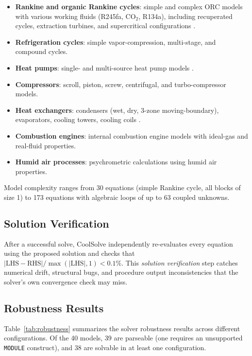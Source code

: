 \documentclass[review,3p]{elsarticle}
\begin{document}
\begin{itemize}
    \item \textbf{Rankine and organic Rankine cycles}: simple and complex ORC models with various working fluids (R245fa, CO$_2$, R134a), including recuperated cycles, extraction turbines, and supercritical configurations \cite{Quoilin2011, Quoilin2013}.
    \item \textbf{Refrigeration cycles}: simple vapor-compression, multi-stage, and compound cycles.
    \item \textbf{Heat pumps}: single- and multi-source heat pump models \cite{Lemort2009}.
    \item \textbf{Compressors}: scroll, piston, screw, centrifugal, and turbo-compressor models.
    \item \textbf{Heat exchangers}: condensers (wet, dry, 3-zone moving-boundary), evaporators, cooling towers, cooling coils \cite{Desideri2014}.
    \item \textbf{Combustion engines}: internal combustion engine models with ideal-gas and real-fluid properties.
    \item \textbf{Humid air processes}: psychrometric calculations using humid air properties.
\end{itemize}

Model complexity ranges from 30 equations (simple Rankine cycle, all blocks of size 1) to 173 equations with algebraic loops of up to 63 coupled unknowns.

\subsection{Solution Verification}

After a successful solve, CoolSolve independently re-evaluates every equation using the proposed solution and checks that $|\text{LHS} - \text{RHS}|/\max(|\text{LHS}|, 1) < 0.1\%$. This \emph{solution verification} step catches numerical drift, structural bugs, and procedure output inconsistencies that the solver's own convergence check may miss.

\subsection{Robustness Results}

Table~\ref{tab:robustness} summarizes the solver robustness results across different configurations. Of the 40 models, 39 are parseable (one requires an unsupported \texttt{MODULE} construct), and 38 are solvable in at least one configuration.
\end{document}
